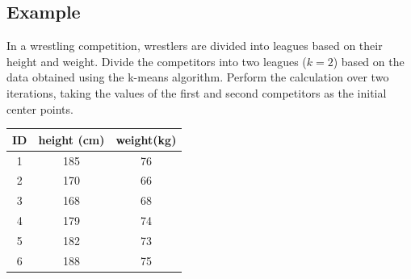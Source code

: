 \documentclass[a4paper,12pt,answers]{article}
\begin{document}
	\subsection{Example}
	In a wrestling competition, wrestlers are divided into leagues based on their height and weight. Divide the competitors into two leagues ($k=2$) based on the data obtained using the k-means algorithm. Perform the calculation over two iterations, taking the values of the first and second competitors as the initial center points.
	
	\begin{table}[H]
		\centering
		\begin{tabular}{|c|c|c|}
			\hline
			ID & height (cm) & weight(kg) \\ \hline \hline
			1 & 185 & 76 \\ \hline
			2 & 170 & 66 \\ \hline
			3 & 168 & 68 \\ \hline
			4 & 179 & 74 \\ \hline
			5 & 182 & 73 \\ \hline
			6 & 188 & 75 \\ \hline
		\end{tabular}
	\end{table}
	
\end{document}
